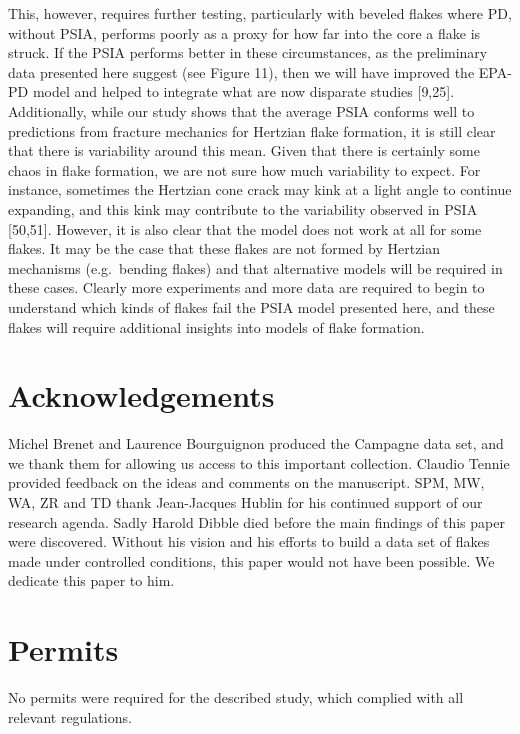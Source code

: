 \documentclass[10pt,letterpaper]{article}
\begin{document}
This, however, requires further testing, particularly with beveled
flakes where PD, without PSIA, performs poorly as a proxy for how far
into the core a flake is struck. If the PSIA performs better in these
circumstances, as the preliminary data presented here suggest (see
Figure 11), then we will have improved the EPA-PD model and helped to
integrate what are now disparate studies {[}9,25{]}. Additionally, while
our study shows that the average PSIA conforms well to predictions from
fracture mechanics for Hertzian flake formation, it is still clear that
there is variability around this mean. Given that there is certainly
some chaos in flake formation, we are not sure how much variability to
expect. For instance, sometimes the Hertzian cone crack may kink at a
light angle to continue expanding, and this kink may contribute to the
variability observed in PSIA {[}50,51{]}. However, it is also clear that
the model does not work at all for some flakes. It may be the case that
these flakes are not formed by Hertzian mechanisms (e.g.~bending flakes)
and that alternative models will be required in these cases. Clearly
more experiments and more data are required to begin to understand which
kinds of flakes fail the PSIA model presented here, and these flakes
will require additional insights into models of flake formation.

\hypertarget{acknowledgements}{%
\section{Acknowledgements}\label{acknowledgements}}

Michel Brenet and Laurence Bourguignon produced the Campagne data set,
and we thank them for allowing us access to this important collection.
Claudio Tennie provided feedback on the ideas and comments on the
manuscript. SPM, MW, WA, ZR and TD thank Jean-Jacques Hublin for his
continued support of our research agenda. Sadly Harold Dibble died
before the main findings of this paper were discovered. Without his
vision and his efforts to build a data set of flakes made under
controlled conditions, this paper would not have been possible. We
dedicate this paper to him.

\hypertarget{permits}{%
\section{Permits}\label{permits}}

No permits were required for the described study, which complied with
all relevant regulations.
\end{document}
